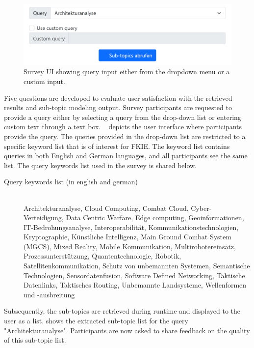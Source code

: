 \begin{figure}[h]
	\centering
	\includegraphics[width=.8\textwidth]{images/survey/query_input.png}
	\caption[Query input from the user.]{Survey UI showing query input either from the dropdown menu or a custom input. \label{fig:survey_question_1}}
\end{figure}

Five questions are developed to evaluate user satisfaction with the retrieved results and sub-topic modeling output. Survey participants are requested to provide a query either by selecting a query from the drop-down list or entering custom text through a text box. ~ depicts the user interface where participants provide the query. The queries provided in the drop-down list are restricted to a specific keyword list that is of interest for \ac{FKIE}. The keyword list contains queries in both English and German languages, and all participants see the same list. The query keywords list used in the survey is shared below.



\begin{description}
	
	\item [Query keywords list (in english and german)] \hfill \\ Architekturanalyse, Cloud Computing, Combat Cloud, Cyber-Verteidigung, Data Centric Warfare, Edge computing, Geoinformationen, IT-Bedrohungsanalyse, Interoperabilität, Kommunikationstechnologien, Kryptographie, Künstliche Intelligenz, Main Ground Combat System (MGCS), Mixed Reality, Mobile Kommunikation, Multirobotereinsatz, Prozessunterstützung, Quantentechnologie, Robotik, Satellitenkommunikation, Schutz von unbemannten Systemen, Semantische Technologien, Sensordatenfusion, Software Defined Networking, Taktische Datenlinks, Taktisches Routing, Unbemannte Landsysteme, Wellenformen und -ausbreitung
	
	
\end{description}

Subsequently, the sub-topics are retrieved during runtime and displayed to the user as a list.  shows the extracted sub-topic list for the query "Architekturanalyse". Participants are now asked to share feedback on the quality of this sub-topic list.



